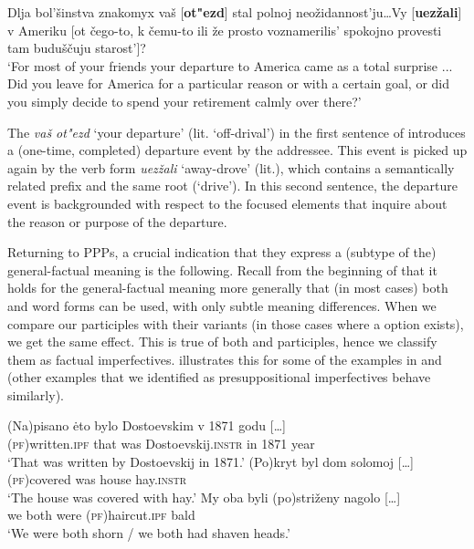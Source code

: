 \documentclass[output=paper,modfonts,newtxmath,hidelinks]{langscibook}
\begin{document}
\ea Dlja bol'šinstva znakomyx vaš [\textbf{ot"ezd}] stal polnoj  neožidannost'ju\dots Vy [\textbf{uezžali}] v Ameriku [ot čego-to, k čemu-to ili že
	prosto voznamerilis' spokojno provesti tam buduščuju starost']?\\
`For most of your friends your departure to America came as a total surprise ... Did you leave for America for a particular reason or with a certain goal, or did you simply decide to spend your retirement calmly over there?'\label{departure}\hfill \citep[][207f.]{gronndiss}
\z

\noindent The  \textit{vaš ot"ezd} `your departure' (lit. `off-drival') in the first sentence of  introduces a (one-time, completed) departure event by the addressee. This event is picked up again by the  verb form \textit{uezžali} `away-drove' (lit.), which contains a semantically related prefix and the same  root (`drive'). In this second sentence, the departure event is backgrounded with respect to the focused elements that inquire about the reason or purpose of the departure. 

Returning to  PPPs, a crucial indication that they express a (subtype of the) general-factual  meaning is the following. Recall from the beginning of  that it holds for the general-factual meaning more generally that (in most cases) both  and  word forms can be used, with only subtle meaning differences. When we compare our  participles with their  variants (in those cases where a  option exists), we get the same effect. This is true of both  and  participles, hence we classify them as factual imperfectives.  illustrates this for some of the examples in  and  (other examples that we identified as presuppositional imperfectives behave similarly). 

\ea\label{pisanoPF}
\ea\gll	(Na)pisano \.{e}to bylo Dostoevskim v 1871 godu [\dots]\\ 
	(\textsc{pf})written.\textsc{ipf} that was Dostoevskij.\textsc{instr} in 1871 year \\
\glt	`That was written by Dostoevskij in 1871.'
\ex\gll	(Po)kryt byl dom solomoj [\dots]\\ 		
	\textsc{(pf)}covered was house hay.\textsc{instr} 	\\
\glt	`The house was covered with hay.'
\ex\gll	My oba byli (po)striženy nagolo [\dots]\\
	we both were (\textsc{pf})haircut.\textsc{ipf} bald\\
\glt	`We were both shorn / we both had shaven heads.'
\z\z
\end{document}
